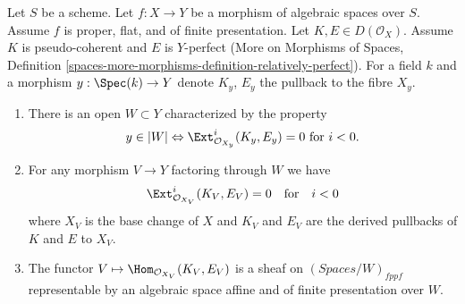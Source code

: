 %
\begin{lemma}
\label{lemma-complexes-open-neg-exts-vanishing}
Let $S$ be a scheme.
Let $f : X \to Y$ be a morphism of algebraic spaces over $S$.
Assume $f$ is proper, flat, and of finite presentation.
Let $K, E \in D(\mathcal{O}_X)$. Assume $K$ is pseudo-coherent
and $E$ is $Y$-perfect (More on Morphisms of Spaces, Definition
\ref{spaces-more-morphisms-definition-relatively-perfect}).
For a field $k$ and a morphism $y : \Spec(k) \to Y$ denote $K_y$, $E_y$
the pullback to the fibre $X_y$.
\begin{enumerate}
\item There is an open $W \subset Y$ characterized by the property
$$
y \in |W|
\Leftrightarrow
\Ext^i_{\mathcal{O}_{X_y}}(K_y, E_y) = 0
\text{ for }i < 0.
$$
\item For any morphism $V \to Y$ factoring through $W$ we have
$$
\Ext^i_{\mathcal{O}_{X_V}}(K_V, E_V) = 0
\quad\text{for}\quad i < 0
$$
where $X_V$ is the base change of $X$ and $K_V$ and $E_V$
are the derived pullbacks of $K$ and $E$ to $X_V$.
\item The functor $V \mapsto \Hom_{\mathcal{O}_{X_V}}(K_V, E_V)$
is a sheaf on $(\textit{Spaces}/W)_{fppf}$ representable by an
algebraic space affine and of finite presentation over $W$.
\end{enumerate}
\end{lemma}

